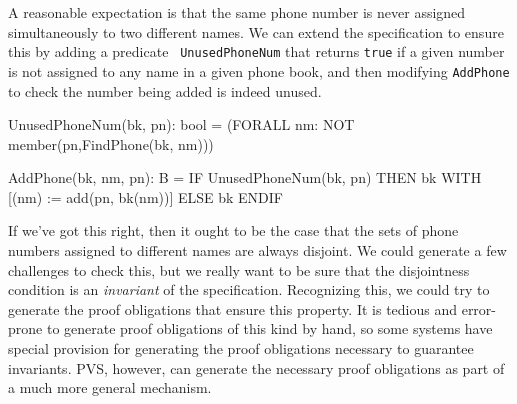 A reasonable expectation is that the same phone number is never
assigned simultaneously to two different names.  We can extend the
specification to ensure this by adding a predicate {\tt
UnusedPhoneNum} that returns {\tt true} if a given number is not
assigned to any name in a given phone book, and  then modifying
{\tt AddPhone} to check the  number being added is indeed unused.
\begin{jmrsession}
  UnusedPhoneNum(bk, pn): bool =
     (FORALL nm: NOT member(pn,FindPhone(bk, nm)))

  AddPhone(bk, nm, pn): B = 
    IF UnusedPhoneNum(bk, pn) THEN bk WITH [(nm) := add(pn, bk(nm))]
      ELSE bk
    ENDIF
\end{jmrsession}

If we've got this right, then it ought to be the case that the sets of
phone numbers assigned to different names are always disjoint.  We
could generate a few challenges to check this, but we really want to
be sure that the disjointness condition is an {\em invariant\/} of the
specification.  Recognizing this, we could try to generate the proof
obligations that ensure this property.   It is tedious and
error-prone to generate proof obligations of this kind by hand, so
some systems have special provision for generating the proof
obligations necessary to guarantee invariants.  PVS, however, can
generate the necessary proof obligations as part of a much more
general mechanism.


